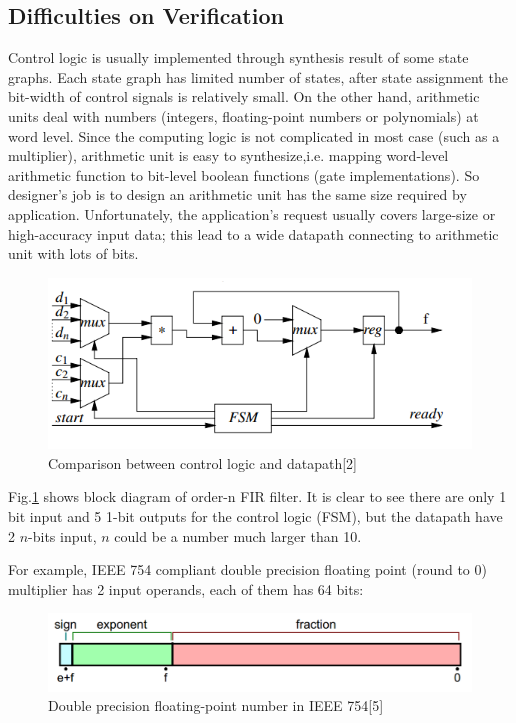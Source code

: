 \documentclass[11pt,twoside, onecolumn]{IEEEtran}
\begin{document}
\subsection{Difficulties on Verification}
Control logic is usually implemented through synthesis result of some state graphs.
Each state graph has limited number of states, after state assignment the bit-width
of control signals is relatively small. On the other hand, arithmetic units deal with
numbers (integers, floating-point numbers or polynomials) at word level. Since the computing
logic is not complicated in most case (such as a multiplier), arithmetic unit is easy to
synthesize,i.e. mapping word-level arithmetic function to bit-level boolean functions (gate implementations).
So designer's job is to design an arithmetic unit has the same size required by application.
Unfortunately, the application's request usually covers large-size or high-accuracy input data;
this lead to a wide datapath connecting to arithmetic unit with lots of bits.
\begin{figure}[hbt]
	\begin{center}
	\includegraphics[scale=0.7]{FIR.png}
	\end{center}
	\caption{Comparison between control logic and datapath[2]}
	\label{fig:FIR}
\end{figure}
Fig.\ref{fig:FIR} shows block diagram of order-n FIR filter. It is clear to see there are only
1 bit input and 5 1-bit outputs for the control logic (FSM), but the datapath have 2 $n$-bits
input, $n$ could be a number much larger than 10.

For example, IEEE 754 compliant double precision floating point (round to 0) multiplier has
2 input operands, each of them has 64 bits:

 \begin{figure}[hbt]
	\begin{center}
	\includegraphics[scale=0.4]{double.png}
	\end{center}
	\caption{Double precision floating-point number in IEEE 754[5]}
	\label{fig:double}
\end{figure}
\end{document}
